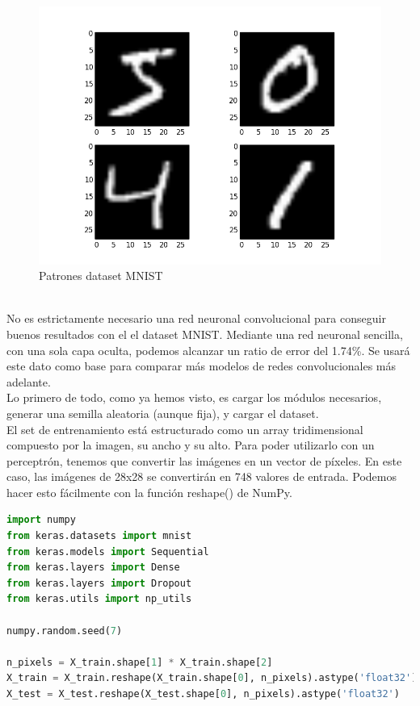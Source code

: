 \mbox{}
\begin{figure}[htp]
\centering
\includegraphics[scale=0.20]{images/mnist.png}
\caption{Patrones dataset MNIST}
\end{figure}
\\No es estrictamente necesario una red neuronal convolucional para conseguir buenos resultados con el el dataset MNIST. Mediante una red neuronal sencilla, con una sola capa oculta, podemos alcanzar un ratio de error del 1.74\%. Se usará este dato como base para comparar más modelos de redes convolucionales más adelante.\\
Lo primero de todo, como ya hemos visto, es cargar los módulos necesarios, generar una semilla aleatoria (aunque fija), y cargar el dataset.\\
El set de entrenamiento está estructurado como un array tridimensional compuesto por la imagen, su ancho y su alto. Para poder utilizarlo con un perceptrón, tenemos que convertir las imágenes en un vector de píxeles. En este caso, las imágenes de 28x28 se convertirán en 748 valores de entrada. Podemos hacer esto fácilmente  con la función reshape() de NumPy.
\begin{lstlisting}[language=Python]
import numpy
from keras.datasets import mnist
from keras.models import Sequential
from keras.layers import Dense
from keras.layers import Dropout
from keras.utils import np_utils

numpy.random.seed(7)

n_pixels = X_train.shape[1] * X_train.shape[2]
X_train = X_train.reshape(X_train.shape[0], n_pixels).astype('float32')
X_test = X_test.reshape(X_test.shape[0], n_pixels).astype('float32')
\end{lstlisting}

